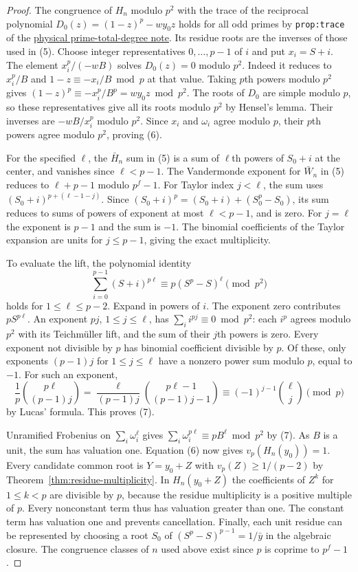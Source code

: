 \documentclass[11pt]{article}
\begin{document}
\begin{proof}
The congruence of $H_n$ modulo $p^2$ with the trace of the
reciprocal polynomial $D_0(z)=(1-z)^p-wy_0z$ holds for all
odd primes by \texttt{prop:trace} of the
\href{PHYSICAL_PRIME_TOTAL_DEGREE_REDUCTION.tex}{physical prime-total-degree note}.
Its residue roots are the inverses of those used in (5).
Choose integer representatives $0,\ldots,p-1$ of $i$ and put
$x_i=S+i$. The element $x_i^p/(-wB)$ solves $D_0(z)=0$
modulo $p^2$. Indeed it reduces to $x_i^p/B$ and
$1-z\equiv-x_i/B\bmod p$ at that value.
Taking $p$th powers modulo $p^2$ gives
$(1-z)^p\equiv-x_i^p/B^p=w y_0z\bmod p^2$.
The roots of $D_0$ are simple modulo $p$, so these
representatives give all its roots modulo $p^2$ by Hensel's lemma.
Their inverses are $-wB/x_i^p$ modulo $p^2$. Since $x_i$ and
$\omega_i$ agree modulo $p$, their $p$th powers agree modulo
$p^2$, proving (6).

For the specified $\ell$, the $\bar H_n$ sum in (5) is a
sum of $\ell$th powers of $S_0+i$ at the center, and vanishes
since $\ell<p-1$. The Vandermonde exponent for $\bar W_n$
in (5) reduces to $\ell+p-1$ modulo $p^f-1$.
For Taylor index $j<\ell$, the sum uses
$(S_0+i)^{p+(\ell-1-j)}$.
Since $(S_0+i)^p=(S_0+i)+(S_0^p-S_0)$, its sum reduces
to sums of powers of exponent at most $\ell<p-1$, and is zero.
For $j=\ell$ the exponent is $p-1$ and the sum is $-1$.
The binomial coefficients of the Taylor expansion are units
for $j\le p-1$, giving the exact multiplicity.

To evaluate the lift, the polynomial identity
\[
        \sum_{i=0}^{p-1}(S+i)^{p\ell}
                    \equiv p(S^p-S)^\ell \pmod{p^2}
 \tag{7}
\]
holds for $1\le\ell\le p-2$.
Expand in powers of $i$. The exponent zero contributes
$pS^{p\ell}$. An exponent $pj$, $1\le j\le\ell$, has
$\sum_i i^{pj}\equiv0\bmod p^2$: each $i^p$ agrees
modulo $p^2$ with its Teichm\"uller lift, and the sum of
their $j$th powers is zero. Every exponent not divisible
by $p$ has binomial coefficient divisible by $p$.
Of these, only exponents $(p-1)j$ for $1\le j\le\ell$ have
a nonzero power sum modulo $p$, equal to $-1$.
For such an exponent,
\[
 \frac1p\binom{p\ell}{(p-1)j}
    =\frac{\ell}{(p-1)j}\binom{p\ell-1}{(p-1)j-1}
    \equiv (-1)^{j-1}\binom{\ell}{j}\pmod p
\]
by Lucas' formula. This proves (7).

Unramified Frobenius on $\sum_i\omega_i^\ell$ gives
$\sum_i\omega_i^{p\ell}\equiv pB^\ell\bmod p^2$ by (7).
As $B$ is a unit, the sum has valuation one.
Equation (6) now gives $v_p(H_n(y_0))=1$.
Every candidate common root is $Y=y_0+Z$ with
$v_p(Z)\ge1/(p-2)$ by Theorem~\ref{thm:residue-multiplicity}.
In $H_n(y_0+Z)$ the coefficients of $Z^k$ for $1\le k<p$
are divisible by $p$, because the residue multiplicity
is a positive multiple of $p$.
Every nonconstant term thus has valuation greater than one.
The constant term has valuation one and prevents cancellation.
Finally, each unit residue can be represented by choosing
a root $S_0$ of $(S^p-S)^{p-1}=1/\bar y$ in the algebraic
closure. The congruence classes of $n$ used above exist
since $p$ is coprime to $p^f-1$.
\end{proof}
\end{document}
